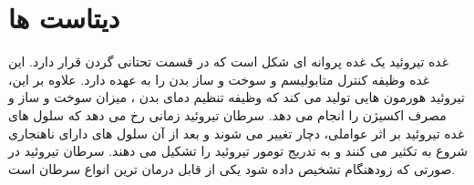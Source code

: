 \section{دیتاست ها}
غده تیروئید یک غده پروانه ای شکل است که در قسمت تحتانی گردن قرار دارد.
این غده وظیفه کنترل متابولیسم و سوخت و ساز بدن را به عهده دارد.
علاوه بر این، تیروئید هورمون هایی تولید می کند که وظیفه تنظیم دمای بدن ، میزان سوخت و ساز و مصرف اکسیژن را انجام می دهد.
سرطان تیروئید زمانی رخ می دهد که سلول های غده تیروئید بر اثر عواملی، دچار تغییر می شوند و بعد از آن سلول های دارای ناهنجاری شروع به تکثیر می کنند و به تدریج تومور تیروئید را تشکیل می دهند.
سرطان تیروئید در صورتی که زودهنگام تشخیص داده شود یکی از قابل درمان ترین انواع سرطان است.



